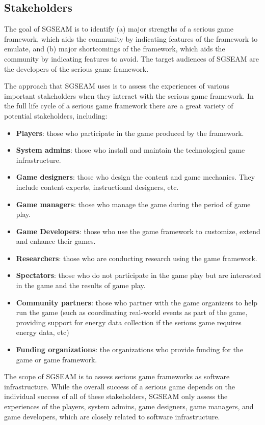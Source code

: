 \documentclass[11pt]{article}
\begin{document}
\subsection{Stakeholders}
The goal of SGSEAM is to identify (a) major strengths of a serious game
framework, which aids the community by indicating features of the framework to emulate, and
(b) major shortcomings of the framework, which aids the community by indicating features to avoid.
The target audiences of SGSEAM are the developers of the serious game framework.

The approach that SGSEAM uses is to assess the experiences of various important stakeholders when
they interact with the serious game framework. In the full life cycle of a serious game framework
there are a great variety of potential stakeholders, including:

\begin{itemize}
\item \textbf{Players}: those who participate in the game produced by the framework.
\item \textbf{System admins}: those who install and maintain the technological game infrastructure.
\item \textbf{Game designers}: those who design the content and game mechanics. They include  content experts, instructional designers, etc.
\item \textbf{Game managers}: those who manage the game during the period of game play.
\item \textbf{Game Developers}: those who use the game framework to customize, extend and enhance their games.
\item \textbf{Researchers}: those who are conducting research using the game framework.
\item \textbf{Spectators}: those who do not participate in the game play but are interested in the game and the results of game play. 
\item \textbf{Community partners}: those who partner with the game organizers to help run the game (such as coordinating real-world events as part of the game, providing support for energy data
  collection if the serious game requires energy data, etc) 
\item \textbf{Funding organizations}: the organizations who provide funding for the game or game framework.
\end{itemize}

The scope of SGSEAM is to assess serious game frameworks as software infrastructure. While
the overall success of a serious game depends on the individual success of all of these
stakeholders, SGSEAM only assess the experiences of the players, system admins, game designers, game managers, and game developers, which are closely related to software infrastructure. 
\end{document}
